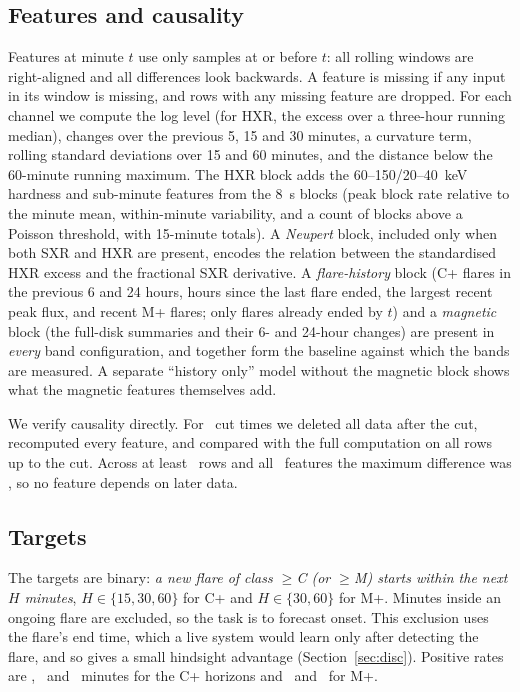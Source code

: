 \documentclass[conference]{IEEEtran}
\begin{document}
\subsection{Features and causality}
Features at minute $t$ use only samples at or before $t$: all rolling windows are right-aligned and all differences look backwards. A feature is missing if any input in its window is missing, and rows with any missing feature are dropped. For each channel we compute the log level (for HXR, the excess over a three-hour running median), changes over the previous 5, 15 and 30 minutes, a curvature term, rolling standard deviations over 15 and 60 minutes, and the distance below the 60-minute running maximum. The HXR block adds the 60--150/20--40~keV hardness and sub-minute features from the 8~s blocks (peak block rate relative to the minute mean, within-minute variability, and a count of blocks above a Poisson threshold, with 15-minute totals). A \emph{Neupert} block, included only when both SXR and HXR are present, encodes the relation between the standardised HXR excess and the fractional SXR derivative. A \emph{flare-history} block (C+ flares in the previous 6 and 24 hours, hours since the last flare ended, the largest recent peak flux, and recent M+ flares; only flares already ended by $t$) and a \emph{magnetic} block (the full-disk summaries and their 6- and 24-hour changes) are present in \emph{every} band configuration, and together form the baseline against which the bands are measured. A separate ``history only'' model without the magnetic block shows what the magnetic features themselves add.

We verify causality directly. For \CausalCuts\ cut times we deleted all data after the cut, recomputed every feature, and compared with the full computation on all rows up to the cut. Across at least \CausalRowsMin\ rows and all \CausalFeatures\ features the maximum difference was \CausalMaxDiff, so no feature depends on later data.

\subsection{Targets}
The targets are binary: \emph{a new flare of class $\ge$C (or $\ge$M) starts within the next $H$ minutes}, $H\in\{15,30,60\}$ for C+ and $H\in\{30,60\}$ for M+. Minutes inside an ongoing flare are excluded, so the task is to forecast onset. This exclusion uses the flare's end time, which a live system would learn only after detecting the flare, and so gives a small hindsight advantage (Section~\ref{sec:disc}). Positive rates are \PosYfifteen, \PosYthirty\ and \PosYsixty\ minutes for the C+ horizons and \PosMthirty\ and \PosMsixty\ for M+.
\end{document}
